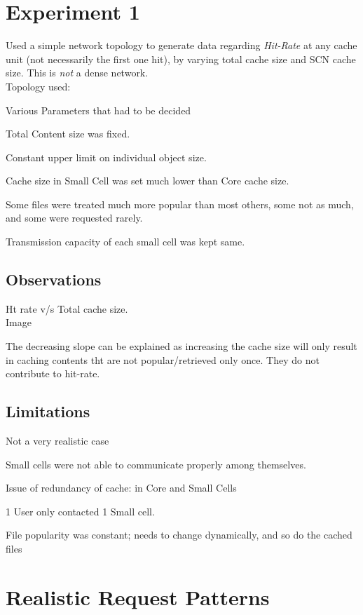 \documentclass[]{article} %
\begin{document}
\section*{Experiment 1}

Used a simple network topology to generate data regarding \textit{Hit-Rate} at any cache unit (not necessarily the first one hit), by varying total cache size and SCN cache size. This is \textit{not} a dense network.\\

Topology used:

Various Parameters that had to be decided 
\begin{itemise}
\item Total Content size was fixed.
\item Constant upper limit on individual object size.
\item Cache size in Small Cell was set much lower than Core cache size.
\item Some files were treated much more popular than most others, some not as much, and some were requested rarely.
\item Transmission capacity of each small cell was kept same.
\end{itemise}

\subsection*{Observations}

Ht rate v/s Total cache size.\\

Image

The decreasing slope can be explained as increasing the cache size will only result in caching contents tht are not popular/retrieved only once. They do not contribute to hit-rate.  

\subsection*{Limitations}
\begin{itemise}
\item Not a very realistic case
\item Small cells were not able to communicate properly among themselves.
\item Issue of redundancy of cache: in Core and Small Cells
\item 1 User only contacted 1 Small cell.
\item File popularity was constant; needs to change dynamically, and so do the cached files
\end{itemise}

\section*{Realistic Request Patterns}
\end{document}
